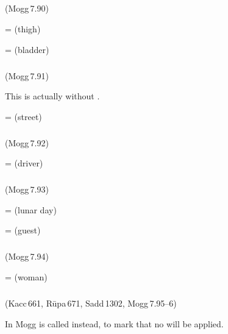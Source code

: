 \subparagraph*{} (Mogg\,7.90)\label{pacckx:thi}

 =  (thigh)\par
{} =  (bladder)\par

\subparagraph*{} (Mogg\,7.91)\label{pacckx:thika}

This is actually  without .

 =  (street)\par

\subparagraph*{} (Mogg\,7.92)\label{pacckx:rathi}

 =  (driver)\par

\subparagraph*{} (Mogg\,7.93)\label{pacckx:ithi}

 =  (lunar day)\par
{} =  (guest)\par

\subparagraph*{} (Mogg\,7.94)\label{pacckx:thii}

 =  (woman)\par

\subparagraph*{} (Kacc\,661, R\=upa\,671, Sadd\,1302, Mogg\,7.95--6)\label{pacckx:da}\label{pacckx:idda}\label{pacckx:daka}

In Mogg  is called  instead, to mark that no  will be applied.

